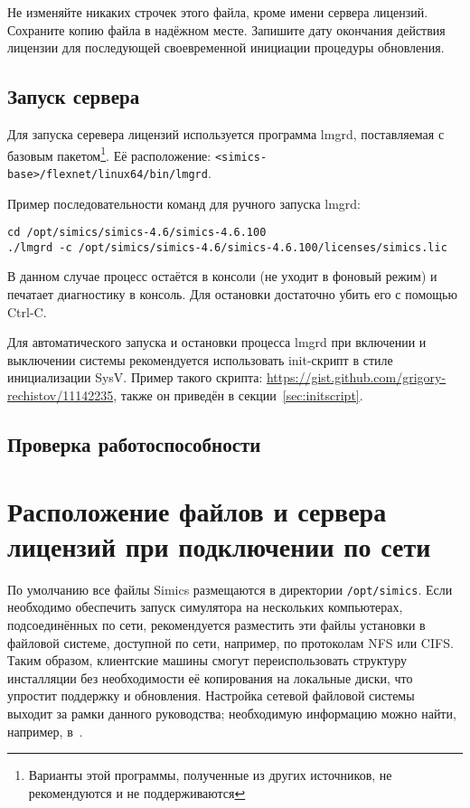 Не изменяйте никаких строчек этого файла, кроме имени сервера лицензий. Сохраните копию файла в надёжном месте. Запишите дату окончания действия лицензии для последующей своевременной инициации процедуры обновления.

\subsection{Запуск сервера}

Для запуска серевера лицензий используется программа lmgrd, поставляемая с базовым пакетом\footnote{Варианты этой программы, полученные из других источников, не рекомендуются и не поддерживаются}. Её расположение: \texttt{<simics-base>/flexnet/linux64/bin/lmgrd}.

Пример последовательности команд для ручного запуска lmgrd:
\begin{lstlisting}
cd /opt/simics/simics-4.6/simics-4.6.100
./lmgrd -c /opt/simics/simics-4.6/simics-4.6.100/licenses/simics.lic
\end{lstlisting}

В данном случае процесс остаётся в консоли (не уходит в фоновый режим) и печатает диагностику в консоль. Для остановки достаточно убить его с помощью Ctrl-C.

Для автоматического запуска и остановки процесса lmgrd при включении и выключении системы рекомендуется использовать init-скрипт в стиле инициализации SysV. Пример такого скрипта: \url{https://gist.github.com/grigory-rechistov/11142235}, также он приведён в секции~\ref{sec:initscript}.

\subsection{Проверка работоспособности}


\section{Расположение файлов и сервера лицензий при подключении по сети}

По умолчанию все файлы Simics размещаются в директории \texttt{/opt/simics}. Если необходимо обеспечить запуск симулятора на нескольких компьютерах, подсоединённых по сети, рекомендуется разместить эти файлы установки в файловой системе, доступной по сети, например, по протоколам NFS или CIFS. Таким образом, клиентские машины смогут переиспользовать структуру инсталляции без необходимости её копирования на локальные диски, что упростит поддержку и обновления. Настройка сетевой файловой системы выходит за рамки данного руководства; необходимую информацию можно найти, например, в~\cite{nfs}.

